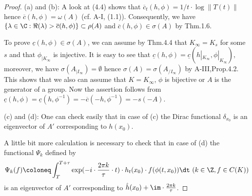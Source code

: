 \begin{proof}	
	(a) and (b): A look at (4.4) shows that $\overline{c}_{t}(h,\phi) = 1/t\cdot\log\|T(t)\|$ hence $\overline{c}(h,\phi) = \omega(A)$ (cf. A-I, (1.1)).  
	Consequently, we have $\{\lambda \in \C : \Re(\lambda) > \overline{c}(h,\phi)\} \subset \rho(A)$ and $\overline{c}(h,\phi) \in \sigma(A)$ by Thm.1.6.
	
	To prove $\underline{c}(h,\phi) \in \sigma(A)$, we can assume by Thm.4.4 that $K_{\infty} = K_{s}$ for some $s$ and that $\phi_{|K_{\infty}}$ is injective.
	It is easy to see that $\underline{c}(h,\phi) = \underline{c}(h|_{K_{\infty}},\phi|_{K_{\infty}})$, moreover, we have $\sigma(A_{|I_{\infty}}) = \emptyset$ hence $\sigma(A) = \sigma(A_{/I_{\infty}})$ by A-III,Prop.4.2.
	This shows that we also can assume that $K = K_{\infty}$, \ie $\phi$ is bijective or $A$ is the generator of a group.
	Now the assertion follows from $\underline{c}(h,\phi) = \underline{c}(h,\phi^{-1}) = -\overline{c}(-h,\phi^{-1}) = -s(-A)$.
	
	(c)	and (d): One can check easily that in case of (c) the Dirac functional $\delta_{x_{0}}$ is an eigenvector of $A'$ corresponding to $h(x_{0})$.
%	
%
%

A little bit more calculation is necessary to check that in case of (d) the functional $\Psi_{k}$ defined by
\[
	\Psi_{k}(f) \coloneq \int_{T}^{T+\tau} \exp(-i\cdot\frac{2\pi k}{\tau}\cdot t)\cdot h_{t}(x_{0})\cdot f(\phi(t,x_{0})) \dt  \ (k \in \Z, f \in C(K))
\]
is an eigenvector of $A'$ corresponding to $\hat{h}(x_{0}) + \im\cdot\frac{2\pi k}{\tau}$.


\end{proof}
